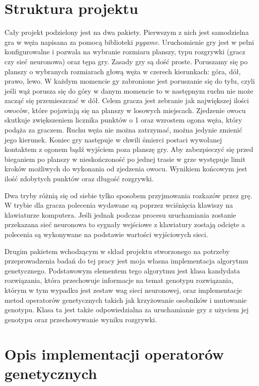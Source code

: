 \documentclass[12pt, oneside, a4paper]{report}
\begin{document}
\section{Struktura projektu}

Cały projekt podzielony jest na dwa pakiety. Pierwszym z nich jest samodzielna gra w węża napisana za pomocą biblioteki \textit{pygame}. Uruchomienie gry jest w pełni konfigurowalne i pozwala na wybranie rozmiaru planszy, typu rozgrywki (gracz czy sieć neuronowa) oraz tępa gry. Zasady gry są dość proste. Poruszamy się po planszy o wybranych rozmiarach głową węża w czerech kierunkach: góra, dół, prawo, lewo. W każdym momencie gy zabronione jest poruszanie się do tyłu, czyli jeśli wąż porusza się do góry w danym momencie to w następnym ruchu nie może zacząć się przemieszczać w dół. Celem gracza jest zebranie jak największej ilości owoców, które pojawiają się na planszy w losowych miejscach. Zjedzenie owocu skutkuje zwiększeniem licznika punktów o 1 oraz wzrostem ogona węża, który podąża za graczem. Ruchu węża nie można zatrzymać, można jedynie zmienić jego kierunek. Koniec gry następuje w chwili śmierci postaci wywołanej kontaktem z ogonem bądź wyjściem poza planszę gry. Aby zabezpieczyć się przed bieganiem po planszy w nieskończoność po jednej trasie w grze występuje limit kroków możliwych do wykonania od zjedzenia owocu. Wynikiem końcowym jest ilość zdobytych punktów oraz długość rozgrywki.

Dwa tryby różnią się od siebie tylko sposobem przyjmowania rozkazów przez grę. W trybie dla gracza polecenia wydawane są poprzez wciśnięcia klawiszy na klawiaturze komputera. Jeśli jednak podczas procesu uruchamiania zostanie przekazana sieć neuronowa to sygnały wejściowe z klawiatury zostają odcięte a polecenia są wykonywane na podstawie wartości wyjściowych sieci.

Drugim pakietem wchodzącym w skład projektu stworzonego na potrzeby przeprowadzenia badań do tej pracy jest moja własna implementacja algorytmu genetycznego. Podstawowym elementem tego algorytmu jest klasa kandydata rozwiązania, która przechowuje informacje na temat genotypu rozwiązania, którym w tym wypadku jest zestaw wag sieci neuronowej, oraz implementacje metod operatorów genetycznych takich jak krzyżowanie osobników i mutowanie genotypu. Klasa ta jest także odpowiedzialna za uruchamianie gry z użyciem jej genotypu oraz przechowywanie wyniku rozgrywki.

\section{Opis implementacji operatorów genetycznych}
\end{document}
